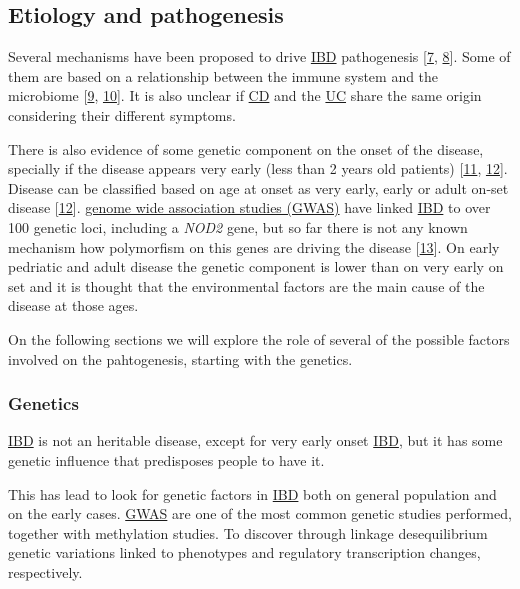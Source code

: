 \documentclass[
  12pt,
  a4paper,
  twoside,
  openright]{book}
\begin{document}
\hypertarget{etiology-and-pathogenesis}{%
\subsection{Etiology and pathogenesis}\label{etiology-and-pathogenesis}}

Several mechanisms have been proposed to drive \protect\hyperlink{acronyms_IBD}{IBD} pathogenesis {[}\protect\hyperlink{ref-zhang2014}{7}, \protect\hyperlink{ref-hugot2004}{8}{]}.
Some of them are based on a relationship between the immune system and the microbiome {[}\protect\hyperlink{ref-silva2016}{9}, \protect\hyperlink{ref-demattos2015}{10}{]}.
It is also unclear if \protect\hyperlink{acronyms_CD}{CD} and the \protect\hyperlink{acronyms_UC}{UC} share the same origin considering their different symptoms.

There is also evidence of some genetic component on the onset of the disease, specially if the disease appears very early (less than 2 years old patients) {[}\protect\hyperlink{ref-mcgovern2015}{11}, \protect\hyperlink{ref-satsangi2006}{12}{]}.
Disease can be classified based on age at onset as very early, early or adult on-set disease {[}\protect\hyperlink{ref-satsangi2006}{12}{]}.
\protect\hyperlink{acronyms_GWAS}{genome wide association studies (GWAS)} have linked \protect\hyperlink{acronyms_IBD}{IBD} to over 100 genetic loci, including a \emph{NOD2} gene, but so far there is not any known mechanism how polymorfism on this genes are driving the disease {[}\protect\hyperlink{ref-horowitz2021}{13}{]}.
On early pedriatic and adult disease the genetic component is lower than on very early on set and it is thought that the environmental factors are the main cause of the disease at those ages.

On the following sections we will explore the role of several of the possible factors involved on the pahtogenesis, starting with the genetics.

\hypertarget{genetics}{%
\subsubsection{Genetics}\label{genetics}}

\protect\hyperlink{acronyms_IBD}{IBD} is not an heritable disease, except for very early onset \protect\hyperlink{acronyms_IBD}{IBD}, but it has some genetic influence that predisposes people to have it.

This has lead to look for genetic factors in \protect\hyperlink{acronyms_IBD}{IBD} both on general population and on the early cases.
\protect\hyperlink{acronyms_GWAS}{GWAS} are one of the most common genetic studies performed, together with methylation studies.
To discover through linkage desequilibrium genetic variations linked to phenotypes and regulatory transcription changes, respectively.
\end{document}
